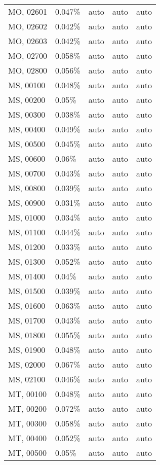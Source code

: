 \begin{longtable}[]{@{}lllll@{}}
MO, 02601 & 0.047\% & auto & auto & auto \\
MO, 02602 & 0.042\% & auto & auto & auto \\
MO, 02603 & 0.042\% & auto & auto & auto \\
MO, 02700 & 0.058\% & auto & auto & auto \\
MO, 02800 & 0.056\% & auto & auto & auto \\
MS, 00100 & 0.048\% & auto & auto & auto \\
MS, 00200 & 0.05\% & auto & auto & auto \\
MS, 00300 & 0.038\% & auto & auto & auto \\
MS, 00400 & 0.049\% & auto & auto & auto \\
MS, 00500 & 0.045\% & auto & auto & auto \\
MS, 00600 & 0.06\% & auto & auto & auto \\
MS, 00700 & 0.043\% & auto & auto & auto \\
MS, 00800 & 0.039\% & auto & auto & auto \\
MS, 00900 & 0.031\% & auto & auto & auto \\
MS, 01000 & 0.034\% & auto & auto & auto \\
MS, 01100 & 0.044\% & auto & auto & auto \\
MS, 01200 & 0.033\% & auto & auto & auto \\
MS, 01300 & 0.052\% & auto & auto & auto \\
MS, 01400 & 0.04\% & auto & auto & auto \\
MS, 01500 & 0.039\% & auto & auto & auto \\
MS, 01600 & 0.063\% & auto & auto & auto \\
MS, 01700 & 0.043\% & auto & auto & auto \\
MS, 01800 & 0.055\% & auto & auto & auto \\
MS, 01900 & 0.048\% & auto & auto & auto \\
MS, 02000 & 0.067\% & auto & auto & auto \\
MS, 02100 & 0.046\% & auto & auto & auto \\
MT, 00100 & 0.048\% & auto & auto & auto \\
MT, 00200 & 0.072\% & auto & auto & auto \\
MT, 00300 & 0.058\% & auto & auto & auto \\
MT, 00400 & 0.052\% & auto & auto & auto \\
MT, 00500 & 0.05\% & auto & auto & auto \\

\end{longtable}

